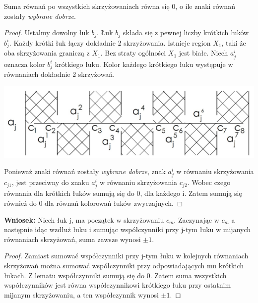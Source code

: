 \begin{lemat}
Suma równań po wszystkich skrzyżowaniach równa się 0, o ile znaki równań zostały \emph{wybrane dobrze}.
\end{lemat}
\begin{proof}
Ustalmy dowolny łuk $b_{j}$. Łuk $b_{j}$ składa się z pewnej liczby krótkich łuków $b_{j}^{i}$. Każdy krótki łuk łączy dokładnie 2 skrzyżowania. Istnieje region $X_{1}$, taki że oba skrzyżowania graniczą z $X_{1}$. Bez straty ogólności $X_{1}$ jest białe. Niech $a_{j}^{i}$ oznacza kolor $b_{j}^{i}$ krótkiego łuku. Kolor każdego krótkiego łuku występuje w równaniach dokładnie 2 skrzyżowań.
\begin{center}
  			\includegraphics[scale=0.3]{2/Obrazy/zerosum2}
\end{center}
Ponieważ znaki równań zostały  \emph{wybrane dobrze}, znak $a_{j}^{i}$ w równaniu skrzyżowania  
$c_{j1}$, jest przeciwny do znaku $a_{j}^{i}$ w równaniu skrzyżowania $c_{j2}$. Wobec czego równania dla krótkich łuków sumują się do 0, dla każdego i. Zatem sumują się również do 0 dla równań kolorowań łuków zwyczajnych.
\end{proof}

\textbf{Wniosek:} Niech łuk j, ma początek w skrzyżowaniu $c_{m}$. Zaczynając w $c_{m}$ a następnie idąc wzdłuż łuku i sumując współczynniki przy j-tym łuku w mijanych równaniach skrzyżowań, suma zawsze wynosi $\pm 1$.
\begin{proof}
Zamiast sumować współczynniki przy j-tym łuku w kolejnych równaniach skrzyżowań można sumować współczynniki przy odpowiadających mu krótkich łukach. Z lematu współczynniki sumują się do 0. Zatem suma wszystkich współczynników jest równa współczynnikowi krótkiego łuku przy ostatnim mijanym skrzyżowaniu, a ten współczynnik wynosi $\pm 1$.

\end{proof}

